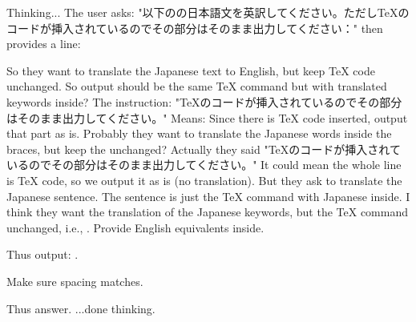 Thinking...
The user asks: "以下のの日本語文を英訳してください。ただしTeXのコードが挿入されているのでその部分はそのまま出力してください：" then provides a line:


So they want to translate the Japanese text to English, but keep TeX code unchanged. So output should be the same TeX command but with translated keywords inside? The instruction: "TeXのコードが挿入されているのでその部分はそのまま出力してください。" Means: Since there is TeX code inserted, output that part as is. Probably they want to translate the Japanese words inside the braces, but keep the  unchanged? Actually they said "TeXのコードが挿入されているのでその部分はそのまま出力してください。" It could mean the whole line is TeX code, so we output it as is (no translation). But they ask to translate the Japanese sentence. The sentence is just the TeX command with Japanese inside. I think they want the translation of the Japanese keywords, but the TeX command unchanged, i.e., . Provide English equivalents inside.

Thus output: .

Make sure spacing matches.

Thus answer.
...done thinking.


